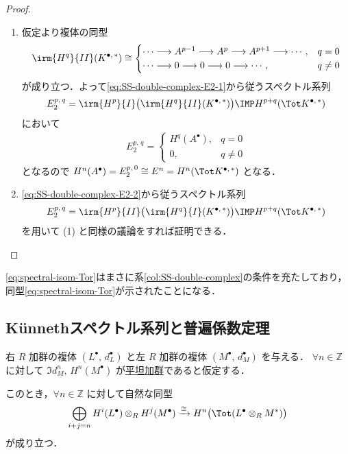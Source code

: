 \documentclass[algtopo_main]{subfiles}
\begin{document}
\begin{proof}
    \begin{enumerate}
        \item 仮定より複体の同型
        \begin{align}
            \irm{H^q}{II} (K^{\bullet,\, *}) \cong
            \begin{cases}
                \cdots \lto  A^{p-1} \lto A^p \lto A^{p+1} \lto \cdots, & q=0 \\
                \cdots \lto  0 \lto 0 \lto 0 \lto \cdots, & q\neq 0
            \end{cases}
        \end{align}
        が成り立つ．よって\eqref{eq:SS-double-complex-E2-1}から従うスペクトル系列
        \begin{align}
            E_2^{p,\, q} = \irm{H^p}{I}\bigl(\irm{H^q}{II} (K^{\bullet,\, *})\bigr) \IMP H^{p+q}( \Tot K^{\bullet,\, *} )
        \end{align}
        において
        \begin{align}
            E_2^{p,\, q} =
            \begin{cases}
                H^q(A^\bullet), & q=0 \\
                0, & q\neq 0
            \end{cases}
        \end{align}
        となるので $H^n(A^\bullet) = E_2^{p,\, 0} \cong E^n = H^n(\Tot K^{\bullet,\, *})$ となる．
        \item \eqref{eq:SS-double-complex-E2-2}から従うスペクトル系列
        \begin{align}
            E_2^{p,\, q} = \irm{H^p}{II}\bigl(\irm{H^q}{I} (K^{\bullet,\, *})\bigr) \IMP H^{p+q}( \Tot K^{\bullet,\, *} )
        \end{align}
        を用いて (1) と同様の議論をすれば証明できる．
    \end{enumerate}
\end{proof}

\eqref{eq:spectral-isom-Tor}はまさに系\ref{col:SS-double-complex}の条件を充たしており，同型\eqref{eq:spectral-isom-Tor}が示されたことになる．

\subsection{K\"unnethスペクトル系列と普遍係数定理}

\begin{mylem}[label=lem:Kunneth]{}
    右 $R$ 加群の複体 $(L^\bullet,\, d_L^\bullet)$ と左 $R$ 加群の複体 $(M^\bullet,\, d_M^\bullet)$ を与える．
    $\forall n \in \mathbb{Z}$ に対して $\Im d_M^n,\, H^n(M^\bullet)$ が\hyperref[def:flat-mod]{平坦加群}であると仮定する．

    このとき，$\forall n \in \mathbb{Z}$ に対して自然な同型
    \begin{align}
        \bigoplus_{i+j = n} H^i(L^\bullet) \otimes_R H^j(M^\bullet) \xrightarrow{\cong} H^n \bigl( \Tot(L^\bullet \otimes_R M^*) \bigr) 
    \end{align}
    が成り立つ．
\end{mylem}
\end{document}
